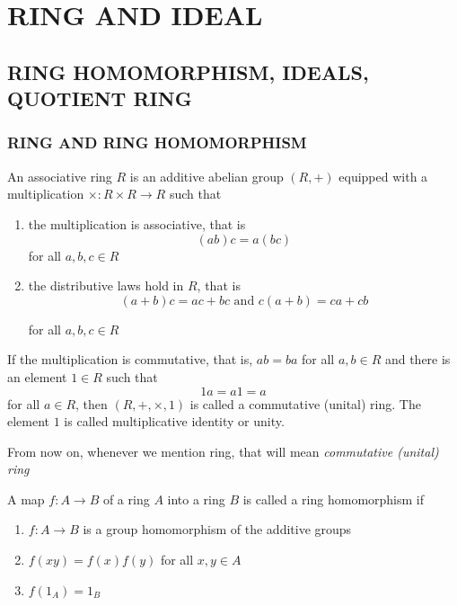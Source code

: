 \chapter{RING AND IDEAL}

\section{RING HOMOMORPHISM, IDEALS, QUOTIENT RING}

\subsection{RING AND RING HOMOMORPHISM}

\begin{definition}
	An associative ring $R$ is an additive abelian group $(R, +)$ equipped with a multiplication $\times: R \times R \to R$ such that
	\begin{enumerate}
		\item the multiplication is associative, that is
		$$
			(ab) c = a (bc)
		$$
		for all $a, b, c \in R$
		
		\item the distributive laws hold in $R$, that is
		$$
			(a + b) c = ac + bc \text{ and } c (a + b) = ca + cb
		$$
		
		for all $a, b, c \in R$
	\end{enumerate}
	
	If the multiplication is commutative, that is, $ab = ba$ for all $a, b \in R$ and there is an element $1 \in R$ such that 
	$$
		1a = a1 = a
	$$ 
	for all $a \in R$, then $(R, +, \times, 1)$ is called a commutative (unital) ring. The element $1$ is called multiplicative identity or unity.
\end{definition}

\begin{remark}
	From now on, whenever we mention ring, that will mean \textit{commutative (unital) ring}
\end{remark}

\begin{definition}
	A map $f: A \to B$ of a ring $A$ into a ring $B$ is called a ring homomorphism if
	\begin{enumerate}
		\item $f: A \to B$ is a group homomorphism of the additive groups
		
		\item $f(xy) = f(x) f(y)$ for all $x, y \in A$
		
		\item $f(1_A) = 1_B$
	\end{enumerate}
\end{definition}

